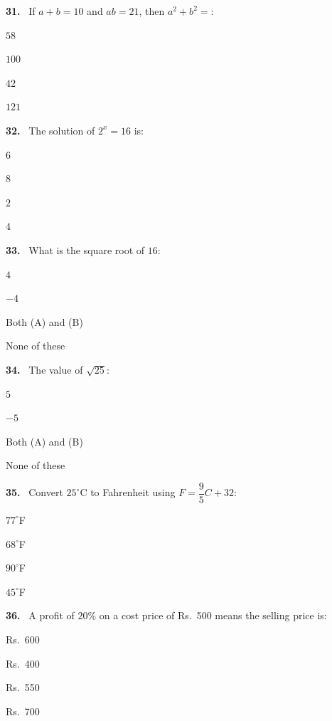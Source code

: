 \documentclass[11pt]{article}
\newenvironment{qenv}[1]{%
  \par\medskip\noindent\textbf{#1.}\ \ignorespaces
}{\par}
\begin{document}
\begin{qenv}{31} If $a+b=10$ and $ab=21$, then $a^2+b^2=$:
\begin{options} \item $58$ \item $100$ \item $42$ \item $121$ \end{options} \end{qenv}

\begin{qenv}{32} The solution of $2^x=16$ is:
\begin{options} \item $6$ \item $8$ \item $2$ \item $4$ \end{options} \end{qenv}

\begin{qenv}{33} What is the square root of $16$:
\begin{options} \item $4$ \item $-4$ \item Both (A) and (B) \item None of these \end{options} \end{qenv}

\begin{qenv}{34} The value of $\sqrt{25}$:
\begin{options} \item $5$ \item $-5$ \item Both (A) and (B) \item None of these \end{options} \end{qenv}

\begin{qenv}{35} Convert $25^{\circ}\text{C}$ to Fahrenheit using $F=\dfrac{9}{5}C+32$:
\begin{options} \item $77^{\circ}$F \item $68^{\circ}$F \item $90^{\circ}$F \item $45^{\circ}$F \end{options} \end{qenv}

\begin{qenv}{36} A profit of $20\%$ on a cost price of Rs.\ 500 means the selling price is:
\begin{options} \item Rs.\ 600 \item Rs.\ 400 \item Rs.\ 550 \item Rs.\ 700 \end{options} \end{qenv}
\end{document}
